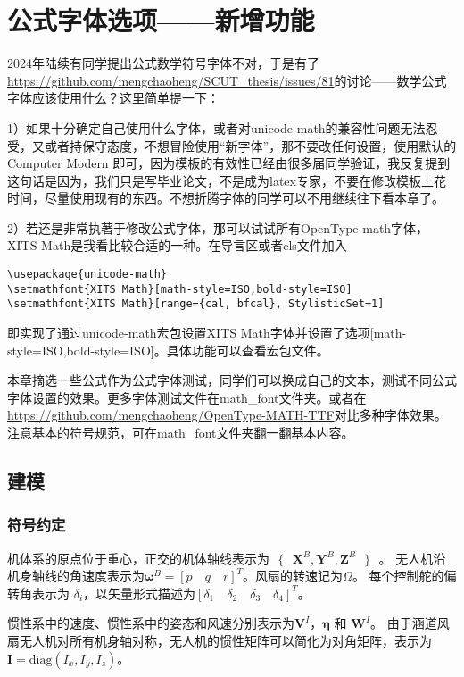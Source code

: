 \chapter{公式字体选项——新增功能}
2024年陆续有同学提出公式数学符号字体不对，于是有了\url{https://github.com/mengchaoheng/SCUT_thesis/issues/81}的讨论——数学公式字体应该使用什么？这里简单提一下：

1）如果十分确定自己使用什么字体，或者对unicode-math的兼容性问题无法忍受，又或者持保守态度，不想冒险使用“新字体”，那不要改任何设置，使用默认的 Computer Modern 即可，因为模板的有效性已经由很多届同学验证，我反复提到这句话是因为，我们只是写毕业论文，不是成为latex专家，不要在修改模板上花时间，尽量使用现有的东西。不想折腾字体的同学可以不用继续往下看本章了。

2）若还是非常执著于修改公式字体，那可以试试所有OpenType math字体，XITS Math是我看比较合适的一种。在导言区或者cls文件加入
\begin{lstlisting}
\usepackage{unicode-math} 
\setmathfont{XITS Math}[math-style=ISO,bold-style=ISO] 
\setmathfont{XITS Math}[range={cal, bfcal}, StylisticSet=1] 
\end{lstlisting}
即实现了通过unicode-math宏包设置XITS Math字体并设置了选项[math-style=ISO,bold-style=ISO]。具体功能可以查看宏包文件。

本章摘选一些公式作为公式字体测试，同学们可以换成自己的文本，测试不同公式字体设置的效果。更多字体测试文件在math\_font文件夹。或者在\url{https://github.com/mengchaoheng/OpenType-MATH-TTF}对比多种字体效果。注意基本的符号规范，可在math\_font文件夹翻一翻基本内容。

\section{建模}
\label{sec:1}
\subsection{符号约定}
机体系的原点位于重心，正交的机体轴线表示为$\text{ }\!\!\{\!\!\text{ }{\boldsymbol{X}^{B}},{\boldsymbol{Y}^{B}},{\boldsymbol{Z}^{B}}\text{ }\!\!\}\!\!\text{ }$。 无人机沿机身轴线的角速度表示为${{\boldsymbol{\omega }}^{B}}=[p \quad q \quad r]^{T}$。风扇的转速记为$\Omega$。 每个控制舵的偏转角表示为 ${{\delta }_{i}}$，以矢量形式描述为$[{{\delta }_{1}} \quad {{\delta }_{2}} \quad {{\delta }_{3}} \quad {{\delta }_{4}}]^T$。



惯性系中的速度、惯性系中的姿态和风速分别表示为${{\boldsymbol{V}}^{I}}$，$\boldsymbol{\eta }$ 和 ${{\boldsymbol{W}}^{I}}$。 
由于涵道风扇无人机对所有机身轴对称，无人机的惯性矩阵可以简化为对角矩阵，表示为 $ \boldsymbol{I}=\text{diag}({{I}_{x} },{{I}_{y}},{{I}_{z}}) $。

